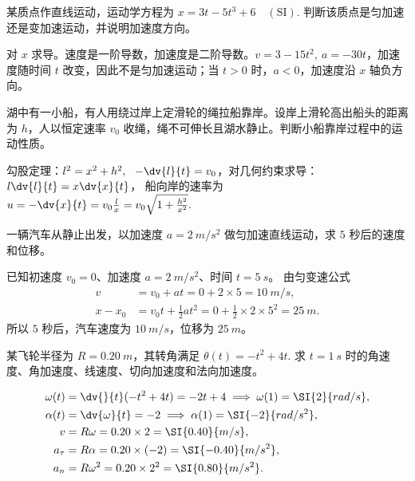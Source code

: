 \begin{exercise}
某质点作直线运动，运动学方程为
 \(x=3t-5t^3+6\quad(\mathrm{SI}).\) 
判断该质点是匀加速还是变加速运动，并说明加速度方向。
\end{exercise}
\begin{solution}
对 \(x\) 求导。速度是一阶导数，加速度是二阶导数。$v=3-15t^2,~ a=-30t$，加速度随时间 \(t\) 改变，因此不是匀加速运动；当 \(t>0\) 时，\(a<0\)，加速度沿 \(x\) 轴负方向。
\end{solution}

\begin{exercise}
湖中有一小船，有人用绕过岸上定滑轮的绳拉船靠岸。设岸上滑轮高出船头的距离为 \(h\)，人以恒定速率 \(v_0\) 收绳，绳不可伸长且湖水静止。判断小船靠岸过程中的运动性质。
\end{exercise}
\begin{solution}
勾股定理：$l^2=x^2+h^2,~~-\dv{l}{t}=v_0$，对几何约束求导：$l\dv{l}{t}=x\dv{x}{t}$，
船向岸的速率为
 \(u=-\dv{x}{t} =v_0\frac{l}{x} =v_0\sqrt{1+\frac{h^2}{x^2}}.\) 
\end{solution}

\begin{exercise}
一辆汽车从静止出发，以加速度 \(a=\SI{2}{m/s^2}\) 做匀加速直线运动，求 \(5\) 秒后的速度和位移。
\end{exercise}

\begin{solution}
已知初速度 \(v_0=0\)、加速度 \(a=\SI{2}{m/s^2}\)、时间 \(t=\SI{5}{s}\)。
由匀变速公式
\[
\begin{aligned}
v&=v_0+at=0+2\times 5=\SI{10}{m/s},\\
x-x_0&=v_0t+\frac{1}{2}at^2=0+\frac{1}{2}\times 2\times 5^2=\SI{25}{m}.
\end{aligned}
\]
所以 \(5\) 秒后，汽车速度为 \(\SI{10}{m/s}\)，位移为 \(\SI{25}{m}\)。
\end{solution}

\begin{exercise}
某飞轮半径为 \(R=\SI{0.20}{m}\)，其转角满足
 \(\theta(t)=-t^2+4t.\) 
求 \(t=\SI{1}{s}\) 时的角速度、角加速度、线速度、切向加速度和法向加速度。
\end{exercise}
\begin{solution}
\[
\begin{aligned}
\omega(t)&=\dv{}{t}(-t^2+4t)=-2t+4
\implies \omega(1)=\SI{2}{rad/s},\\
\alpha(t)&=\dv{\omega}{t}=-2
\implies \alpha(1)=\SI{-2}{rad/s^2},\\
v&=R\omega=0.20\times 2=\SI{0.40}{m/s},\\
a_\tau&=R\alpha=0.20\times(-2)=\SI{-0.40}{m/s^2},\\
a_n&=R\omega^2=0.20\times 2^2=\SI{0.80}{m/s^2}.
\end{aligned}
\]
\end{solution}

